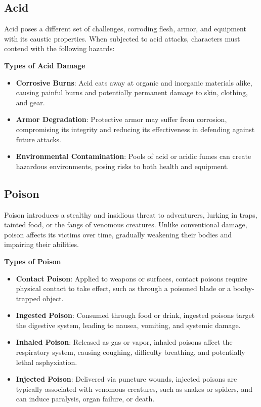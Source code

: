 \documentclass[12pt]{book}  %
\begin{document}
\subsection{Acid}

Acid poses a different set of challenges, corroding flesh, armor, and equipment with its caustic properties. When subjected to acid attacks, characters must contend with the following hazards:

\textbf{Types of Acid Damage}

\begin{itemize}
    \item \textbf{Corrosive Burns}: Acid eats away at organic and inorganic materials alike, causing painful burns and potentially permanent damage to skin, clothing, and gear.
    \item \textbf{Armor Degradation}: Protective armor may suffer from corrosion, compromising its integrity and reducing its effectiveness in defending against future attacks.
    \item \textbf{Environmental Contamination}: Pools of acid or acidic fumes can create hazardous environments, posing risks to both health and equipment.
\end{itemize}

\subsection{Poison}

Poison introduces a stealthy and insidious threat to adventurers, lurking in traps, tainted food, or the fangs of venomous creatures. Unlike conventional damage, poison affects its victims over time, gradually weakening their bodies and impairing their abilities.

\textbf{Types of Poison}

\begin{itemize}
    \item \textbf{Contact Poison}: Applied to weapons or surfaces, contact poisons require physical contact to take effect, such as through a poisoned blade or a booby-trapped object.
    \item \textbf{Ingested Poison}: Consumed through food or drink, ingested poisons target the digestive system, leading to nausea, vomiting, and systemic damage.
    \item \textbf{Inhaled Poison}: Released as gas or vapor, inhaled poisons affect the respiratory system, causing coughing, difficulty breathing, and potentially lethal asphyxiation.
    \item \textbf{Injected Poison}: Delivered via puncture wounds, injected poisons are typically associated with venomous creatures, such as snakes or spiders, and can induce paralysis, organ failure, or death.
\end{itemize}
\end{document}
